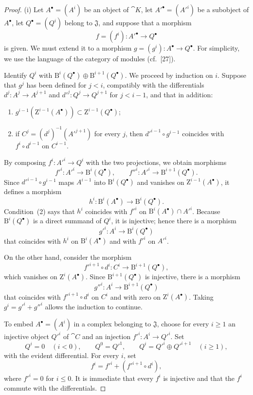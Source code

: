 \begin{proof}
{\rm(i)}
Let $A^\bullet=(A^i)$ be an object of $\cat{K}$, let $A'^\bullet=(A'^i)$ be a subobject of $A^\bullet$, let $Q^\bullet=(Q^i)$ belong to $\mathfrak{J}$, and suppose that a morphism
\[
  f=(f^i):A'^\bullet\longrightarrow Q^\bullet
\]
is given.
We must extend it to a morphism $g=(g^i):A^\bullet\to Q^\bullet$.
For simplicity, we use the language of the category of modules (cf.~[27]).

Identify $Q^i$ with $\mathrm{B}^i(Q^\bullet)\oplus\mathrm{B}^{i+1}(Q^\bullet)$.
We proceed by induction on $i$.
Suppose that $g^j$ has been defined for $j<i$, compatibly with the differentials $d^j:A^j\to A^{j+1}$ and $d'^j:Q^j\to Q^{j+1}$ for $j<i-1$, and that in addition:
\begin{enumerate}
  \item[{\rm(1)}] $g^{i-1}(\mathrm{Z}^{i-1}(A^\bullet))\subset\mathrm{Z}^{i-1}(Q^\bullet)$;
  \item[{\rm(2)}] if $C^j=(d^j)^{-1}(A'^{j+1})$ for every $j$, then $d'^{i-1}\circ g^{i-1}$ coincides with $f^i\circ d^{i-1}$ on $C^{i-1}$.
\end{enumerate}
By composing $f^i:A'^i\to Q^i$ with the two projections, we obtain morphisms
\[
  f'^i:A'^i\longrightarrow\mathrm{B}^i(Q^\bullet),
  \qquad
  f''^i:A'^i\longrightarrow\mathrm{B}^{i+1}(Q^\bullet).
\]
Since $d'^{i-1}\circ g^{i-1}$ maps $A^{i-1}$ into $\mathrm{B}^i(Q^\bullet)$ and vanishes on $\mathrm{Z}^{i-1}(A^\bullet)$, it defines a morphism
\[
  h^i:\mathrm{B}^i(A^\bullet)\longrightarrow\mathrm{B}^i(Q^\bullet).
\]
Condition~{\rm(2)} says that $h^i$ coincides with $f'^i$ on $\mathrm{B}^i(A^\bullet)\cap A'^i$.
Because $\mathrm{B}^i(Q^\bullet)$ is a direct summand of $Q^i$, it is injective; hence there is a morphism
\[
  g'^i:A^i\longrightarrow\mathrm{B}^i(Q^\bullet)
\]
that coincides with $h^i$ on $\mathrm{B}^i(A^\bullet)$ and with $f'^i$ on $A'^i$.

On the other hand, consider the morphism
\[
  f'^{i+1}\circ d^i:C^i\longrightarrow\mathrm{B}^{i+1}(Q^\bullet),
\]
which vanishes on $\mathrm{Z}^i(A^\bullet)$.
Since $\mathrm{B}^{i+1}(Q^\bullet)$ is injective, there is a morphism
\[
  g''^i:A^i\longrightarrow\mathrm{B}^{i+1}(Q^\bullet)
\]
that coincides with $f'^{i+1}\circ d^i$ on $C^i$ and with zero on $\mathrm{Z}^i(A^\bullet)$.
Taking $g^i=g'^i+g''^i$ allows the induction to continue.

\smallskip
{}
To embed $A^\bullet=(A^i)$ in a complex belonging to $\mathfrak{J}$, choose for every $i\geq1$ an injective object $Q'^i$ of $\cat{C}$ and an injection $f'^i:A^i\to Q'^i$.
Set
\[
  Q^i=0\quad(i<0),\qquad Q^0=Q'^1,\qquad
  Q^i=Q'^i\oplus Q'^{i+1}\quad(i\geq1),
\]
with the evident differential.
For every $i$, set
\[
  f^i=f'^i+(f'^{i+1}\circ d^i),
\]
where $f'^i=0$ for $i\leq0$.
It is immediate that every $f^i$ is injective and that the $f^i$ commute with the differentials.
\end{proof}


